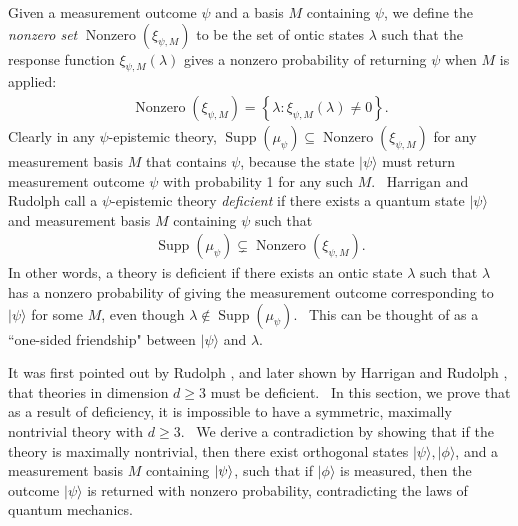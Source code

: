\documentclass[letterpaper,11pt]{article}
\newcommand{\ket}[1]{\mbox{$ | #1 \rangle $}}
\DeclareMathOperator{\supp}{Supp}
\DeclareMathOperator{\nz}{Nonzero}
\begin{document}
Given a measurement outcome $\psi$ and a basis $M$ containing $\psi$, we define the \emph{nonzero set} $\nz(\xi_{\psi,M})$ to be the set of ontic states $\lambda$ such that the response function $\xi_{\psi,M}(\lambda)$ gives a nonzero probability of returning $\psi$ when $M$ is applied:
\begin{eqnarray}
\nz(\xi_{\psi,M}) = \left\{\lambda: \xi_{\psi,M}(\lambda)\neq0\right\}.
\end{eqnarray}
Clearly in any $\psi$-epistemic theory, $\supp(\mu_\psi)
\subseteq \nz(\xi_{\psi,M})$ for any measurement basis $M$ that contains $\psi$, because the state $ | \psi \rangle $ must return measurement
outcome $\psi$ with probability 1 for any such $M$. \ Harrigan and Rudolph \cite{hr} call a $\psi$-epistemic theory \textit{deficient} if there exists a quantum state $ | \psi
\rangle $ and measurement basis $M$ containing $\psi$ such that
\begin{eqnarray}
\supp(\mu_{\psi}) \subsetneq \nz(\xi_{\psi,M}).  \label{deficiency}
\end{eqnarray}
In other words, a theory is deficient if there exists an ontic state $\lambda$ such that $\lambda$
has a nonzero probability of giving the measurement outcome corresponding to $%
 | \psi \rangle $ for some $M$, even though $\lambda\notin \supp(\mu_{\psi})
$. \ This can be thought of as a ``one-sided friendship" between $%
 | \psi \rangle $ and $\lambda$.

It was first pointed out by Rudolph \cite{rudolph}, and later shown by
Harrigan and Rudolph \cite{hr}, that theories in dimension $d\geq 3$ must be
deficient. \ In this section, we prove that as a result of deficiency, it is impossible
to have a symmetric, maximally nontrivial theory with $d\geq 3$. \ We derive a
contradiction by showing that if the theory is maximally nontrivial, then
there exist orthogonal states $ | \psi \rangle, |
\phi \rangle $, and a measurement basis $M$ containing $\ket{\psi}$, such that if $ | \phi
\rangle $ is measured, then the outcome $ | \psi
\rangle $ is returned with nonzero probability, contradicting the
laws of quantum mechanics.
\end{document}
